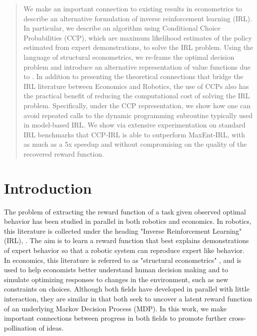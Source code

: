 \documentclass{article}
\begin{document}
\begin{abstract}
We make an important connection to existing results in econometrics to describe an alternative formulation of inverse reinforcement learning (IRL). In particular, we describe an algorithm using Conditional Choice Probabilities (CCP), which are maximum likelihood estimates of the policy estimated from expert demonstrations, to solve the IRL problem. Using the language of structural econometrics, we re-frame the optimal decision problem and introduce an alternative representation of value functions due to \cite{hotz}. In addition to presenting the theoretical connections that bridge the IRL literature between Economics and Robotics, the use of CCPs also has the practical benefit of reducing the computational cost of solving the IRL problem. Specifically, under the CCP representation, we show how one can avoid repeated calls to the dynamic programming subroutine typically used in model-based IRL. We show via extensive experimentation on standard IRL benchmarks that CCP-IRL is able to outperform MaxEnt-IRL, with as much as a 5x speedup and without compromising on the quality of the recovered reward function.
\end{abstract} 

\section{Introduction}

The problem of extracting the reward function of a task given observed optimal behavior has been studied in parallel in both robotics and economics. In robotics, this literature is collected under the heading "Inverse Reinforcement Learning" (IRL), \cite{Ng2000, abbeel2004apprenticeship}. The aim is to learn a reward function that best explains demonstrations of expert behavior so that a robotic system can reproduce expert like behavior. In economics, this literature is referred to as "structural econometrics" \cite{miller, pakes, rust_gmc}, and is used to help economists better understand human decision making and to simulate optimizing responses to changes in the environment, such as new constraints on choices. Although both fields have developed in parallel with little interaction, they are similar in that both seek to uncover a latent reward function of an underlying Markov Decision Process (MDP). In this work, we make important connections between progress in both fields to promote further cross-pollination of ideas.

\end{document}

